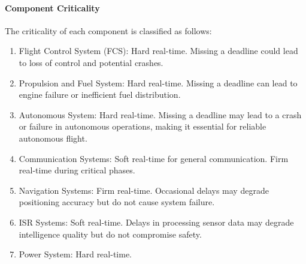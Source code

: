 \documentclass[a4paper,11pt]{article}
\begin{document}
	\paragraph{Component Criticality}
	The criticality of each component is classified as follows:
	\begin{enumerate}[label=C\arabic*)]
		\item Flight Control System (FCS): Hard real-time. Missing a deadline could lead to loss of control and potential crashes.
		\item Propulsion and Fuel System: Hard real-time. Missing a deadline can lead to engine failure or inefficient fuel distribution.
		\item Autonomous System: Hard real-time. Missing a deadline may lead to a crash or failure in autonomous operations, making it essential for reliable autonomous flight.
		\item Communication Systems: Soft real-time for general communication. Firm real-time during critical phases.
		\item Navigation Systems: Firm real-time. Occasional delays may degrade positioning accuracy but do not cause system failure.
		\item ISR Systems: Soft real-time. Delays in processing sensor data may degrade intelligence quality but do not compromise safety.
		\item Power System: Hard real-time.
	\end{enumerate}
\end{document}
